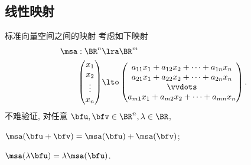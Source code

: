 \subsection{线性映射}
\begin{frame}{标准向量空间之间的映射\noexer}
	\onslide<+->
	考虑如下映射
	\begin{align*}
		\msa:\BR^n&\lra\BR^m\\
		\begin{pmatrix}
			x_1\\
			x_2\\
			\vdots\\
			x_n
		\end{pmatrix}&\lto
		\begin{pmatrix}
			a_{11}x_1+a_{12}x_2+\cdots+a_{1n}x_n\\
			a_{21}x_1+a_{22}x_2+\cdots+a_{2n}x_n\\
			\vvdots\\
			a_{m1}x_1+a_{m2}x_2+\cdots+a_{mn}x_n
		\end{pmatrix}.
	\end{align*}
	\onslide<+->
	不难验证, 对任意 $\bfu,\bfv\in\BR^n,\lambda\in\BR$,
	\begin{enumV}[L]
		\item $\msa(\bfu+\bfv)=\msa(\bfu)+\msa(\bfv)$;\label{enum:L1}
		\item $\msa(\lambda\bfu)=\lambda \msa(\bfu)$.\label{enum:L2}
	\end{enumV}
\end{frame}


